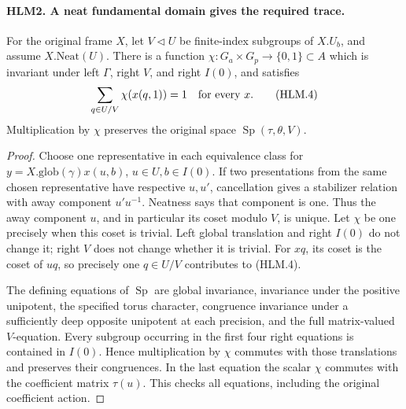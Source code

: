 \paragraph{HLM2. A neat fundamental domain gives the required trace.}
\label{claim:HLM2}
For the original frame \(X\), let \(V\triangleleft U\) be
finite-index subgroups of \(X.U_b\), and assume \(X.\mathrm{Neat}(U)\).
There is a function \(\chi:G_a\times G_p\to\{0,1\}\subset A\)
which is invariant under left \(\Gamma\), right \(V\), and
right \(I(0)\), and satisfies
\[
     \sum_{q\in U/V}\chi(x(q,1))=1\quad\hbox{for every }x.
 \tag{HLM.4}
\]
Multiplication by \(\chi\) preserves the original space
\(\operatorname{Sp}(\tau,\theta,V)\).
\begin{proof}
Choose one representative in each equivalence class for
\(y=X.\mathrm{glob}(\gamma)x(u,b)\),
\(u\in U,b\in I(0)\).  If two presentations from the same
chosen representative have respective \(u,u'\), cancellation
gives a stabilizer relation with away component \(u'u^{-1}\).
Neatness says that component is one.  Thus the away component
\(u\), and in particular its coset modulo \(V\), is unique.
Let \(\chi\) be one precisely when this coset is trivial.
Left global translation and right \(I(0)\) do not change it;
right \(V\) does not change whether it is trivial.  For
\(xq\), its coset is the coset of \(uq\), so precisely one
\(q\in U/V\) contributes to (HLM.4).

The defining equations of \(\operatorname{Sp}\) are global
invariance, invariance under the positive unipotent, the specified
torus character, congruence invariance under a sufficiently deep
opposite unipotent at each precision, and the full matrix-valued
\(V\)-equation.  Every subgroup occurring in the first four
right equations is contained in \(I(0)\).  Hence multiplication
by \(\chi\) commutes with those translations and preserves
their congruences.  In the last equation the scalar \(\chi\)
commutes with the coefficient matrix \(\tau(u)\).  This checks
all equations, including the original coefficient action.
\end{proof}

